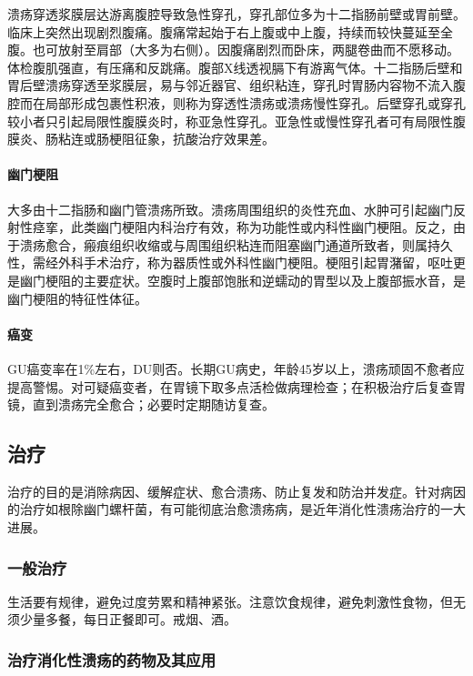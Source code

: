 溃疡穿透浆膜层达游离腹腔导致急性穿孔，穿孔部位多为十二指肠前壁或胃前壁。临床上突然出现剧烈腹痛。腹痛常起始于右上腹或中上腹，持续而较快蔓延至全腹。也可放射至肩部（大多为右侧）。因腹痛剧烈而卧床，两腿卷曲而不愿移动。体检腹肌强直，有压痛和反跳痛。腹部X线透视膈下有游离气体。十二指肠后壁和胃后壁溃疡穿透至浆膜层，易与邻近器官、组织粘连，穿孔时胃肠内容物不流入腹腔而在局部形成包裹性积液，则称为穿透性溃疡或溃疡慢性穿孔。后壁穿孔或穿孔较小者只引起局限性腹膜炎时，称亚急性穿孔。亚急性或慢性穿孔者可有局限性腹膜炎、肠粘连或肠梗阻征象，抗酸治疗效果差。

\paragraph{幽门梗阻}

大多由十二指肠和幽门管溃疡所致。溃疡周围组织的炎性充血、水肿可引起幽门反射性痉挛，此类幽门梗阻内科治疗有效，称为功能性或内科性幽门梗阻。反之，由于溃疡愈合，瘢痕组织收缩或与周围组织粘连而阻塞幽门通道所致者，则属持久性，需经外科手术治疗，称为器质性或外科性幽门梗阻。梗阻引起胃潴留，呕吐更是幽门梗阻的主要症状。空腹时上腹部饱胀和逆蠕动的胃型以及上腹部振水音，是幽门梗阻的特征性体征。

\paragraph{癌变}

GU癌变率在1\%左右，DU则否。长期GU病史，年龄45岁以上，溃疡顽固不愈者应提高警惕。对可疑癌变者，在胃镜下取多点活检做病理检查；在积极治疗后复查胃镜，直到溃疡完全愈合；必要时定期随访复查。

\subsection{治疗}

治疗的目的是消除病因、缓解症状、愈合溃疡、防止复发和防治并发症。针对病因的治疗如根除幽门螺杆菌，有可能彻底治愈溃疡病，是近年消化性溃疡治疗的一大进展。

\subsubsection{一般治疗}

生活要有规律，避免过度劳累和精神紧张。注意饮食规律，避免刺激性食物，但无须少量多餐，每日正餐即可。戒烟、酒。

\subsubsection{治疗消化性溃疡的药物及其应用}

